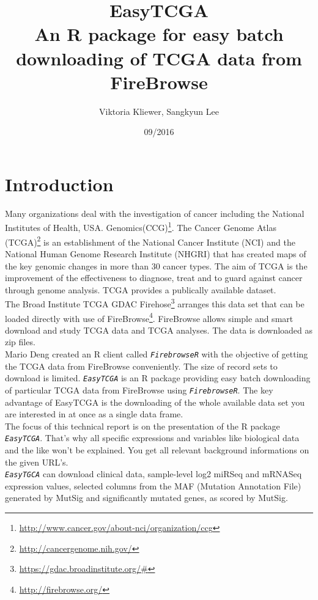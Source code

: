 \documentclass{TechReport}
\title{EasyTCGA\\ An R package for easy batch downloading of TCGA data from FireBrowse}
\author{Viktoria Kliewer, Sangkyun Lee}
\date{09/2016}        %
\begin{document}
\makesfbtitlepage



\section{Introduction}
Many organizations deal with the investigation of cancer including the National
Institutes of Health, USA.
Genomics(CCG)\footnote{\url{http://www.cancer.gov/about-nci/organization/ccg}}. 
The Cancer Genome Atlas (TCGA)\footnote{\url{http://cancergenome.nih.gov/}} is an
establishment of the
National Cancer Institute (NCI) and the National Human Genome Research Institute
(NHGRI)
that has created maps of the key genomic changes in more than 30 cancer types. The
aim of TCGA is the improvement
of the effectiveness to diagnose, treat and to guard against cancer through genome
analysis. TCGA provides a
publically available dataset.\\
The Broad Institute TCGA GDAC
Firehose\footnote{\url{https://gdac.broadinstitute.org/#}} arranges this
data set that can be loaded directly with use of
FireBrowse\footnote{\url{http://firebrowse.org/}}. FireBrowse allows
simple and smart download and study TCGA data and TCGA analyses. The data is
downloaded as zip files.\\
Mario Deng created an R client called \texttt{\em FirebrowseR} with the objective of
getting the TCGA data from FireBrowse conveniently.
The size of record sets to download is limited. \texttt{\em EasyTCGA} is an R
package providing easy batch downloading of particular
TCGA data from FireBrowse using \texttt{\em FirebrowseR}. The key advantage of
EasyTCGA is the downloading of the whole available
data set you are interested in at once as a single data frame. \\
The focus of this technical report is on the presentation of the R package
\texttt{\em EasyTCGA}. That's why all specific expressions and variables 
like biological data and the like won't be explained. You get all relevant
background informations on the given URL's.\\
\texttt{\em EasyTGCA} can download clinical data, sample-level log2 miRSeq and
mRNASeq expression values, selected columns
from the MAF (Mutation Annotation File) generated by MutSig and significantly
mutated genes, as scored by MutSig.\\
\end{document}
